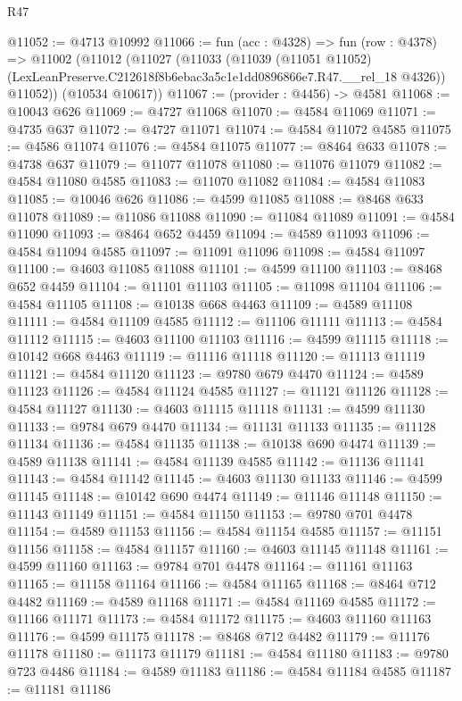 \begin{lexlean}{R47}
\begin{coremodule}
@11052 := @4713 @10992
@11066 := fun (acc : @4328) =>
  fun (row : @4378) =>
  @11002
    (@11012
      (@11027
        (@11033
          (@11039
            (@11051 @11052)
            (LexLeanPreserve.C212618f8b6ebac3a5c1e1dd0896866e7.R47.__rel_18 @4326))
          @11052))
      (@10534 @10617))
@11067 := (provider : @4456) -> @4581
@11068 := @10043 @626
@11069 := @4727 @11068
@11070 := @4584 @11069
@11071 := @4735 @637
@11072 := @4727 @11071
@11074 := @4584 @11072 @4585
@11075 := @4586 @11074
@11076 := @4584 @11075
@11077 := @8464 @633
@11078 := @4738 @637
@11079 := @11077 @11078
@11080 := @11076 @11079
@11082 := @4584 @11080 @4585
@11083 := @11070 @11082
@11084 := @4584 @11083
@11085 := @10046 @626
@11086 := @4599 @11085
@11088 := @8468 @633 @11078
@11089 := @11086 @11088
@11090 := @11084 @11089
@11091 := @4584 @11090
@11093 := @8464 @652 @4459
@11094 := @4589 @11093
@11096 := @4584 @11094 @4585
@11097 := @11091 @11096
@11098 := @4584 @11097
@11100 := @4603 @11085 @11088
@11101 := @4599 @11100
@11103 := @8468 @652 @4459
@11104 := @11101 @11103
@11105 := @11098 @11104
@11106 := @4584 @11105
@11108 := @10138 @668 @4463
@11109 := @4589 @11108
@11111 := @4584 @11109 @4585
@11112 := @11106 @11111
@11113 := @4584 @11112
@11115 := @4603 @11100 @11103
@11116 := @4599 @11115
@11118 := @10142 @668 @4463
@11119 := @11116 @11118
@11120 := @11113 @11119
@11121 := @4584 @11120
@11123 := @9780 @679 @4470
@11124 := @4589 @11123
@11126 := @4584 @11124 @4585
@11127 := @11121 @11126
@11128 := @4584 @11127
@11130 := @4603 @11115 @11118
@11131 := @4599 @11130
@11133 := @9784 @679 @4470
@11134 := @11131 @11133
@11135 := @11128 @11134
@11136 := @4584 @11135
@11138 := @10138 @690 @4474
@11139 := @4589 @11138
@11141 := @4584 @11139 @4585
@11142 := @11136 @11141
@11143 := @4584 @11142
@11145 := @4603 @11130 @11133
@11146 := @4599 @11145
@11148 := @10142 @690 @4474
@11149 := @11146 @11148
@11150 := @11143 @11149
@11151 := @4584 @11150
@11153 := @9780 @701 @4478
@11154 := @4589 @11153
@11156 := @4584 @11154 @4585
@11157 := @11151 @11156
@11158 := @4584 @11157
@11160 := @4603 @11145 @11148
@11161 := @4599 @11160
@11163 := @9784 @701 @4478
@11164 := @11161 @11163
@11165 := @11158 @11164
@11166 := @4584 @11165
@11168 := @8464 @712 @4482
@11169 := @4589 @11168
@11171 := @4584 @11169 @4585
@11172 := @11166 @11171
@11173 := @4584 @11172
@11175 := @4603 @11160 @11163
@11176 := @4599 @11175
@11178 := @8468 @712 @4482
@11179 := @11176 @11178
@11180 := @11173 @11179
@11181 := @4584 @11180
@11183 := @9780 @723 @4486
@11184 := @4589 @11183
@11186 := @4584 @11184 @4585
@11187 := @11181 @11186

\end{coremodule}
\end{lexlean}
